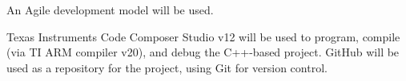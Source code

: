 \begin{flushleft}
\end{flushleft}
\begin{flushleft}
\end{flushleft}
\begin{flushleft}
\end{flushleft}
\begin{flushleft}
\end{flushleft}
\begin{flushleft}
    An Agile development model will be used.
\end{flushleft}
\begin{flushleft}
    Texas Instruments Code Composer Studio v12 will be used to program,
    compile (via TI ARM compiler v20), and debug the C++-based project. GitHub
    will be used as a repository for the project, using Git for version
    control.
\end{flushleft}